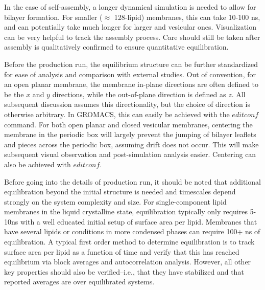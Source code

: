 \documentclass[9pt,bestpractices]{livecoms}
\begin{document}
In the case of self-assembly, a longer dynamical simulation is needed to allow for bilayer formation.
For smaller ($\approx$ 128-lipid) membranes, this can take 10-100 ns, and can potentially take much longer for larger and vesicular ones.
Visualization can be very helpful to track the assembly process.
Care should still be taken after assembly is qualitatively confirmed to ensure quantitative equilibration.

Before the production run, the equilibrium structure can be further standardized for ease of analysis and comparison with external studies.
Out of convention, for an open planar membrane, the membrane in-plane directions are often defined to be the $x$ and $y$ directions, while the out-of-plane direction is defined as $z$.
All subsequent discussion assumes this directionality, but the choice of direction is otherwise arbitrary.
In GROMACS, this can easily be achieved with the $editconf$ command.
For both open planar and closed vesicular membranes, centering the membrane in the periodic box will largely prevent the jumping of bilayer leaflets and pieces across the periodic box, assuming drift does not occur.
This will make subsequent visual observation and post-simulation analysis easier.
Centering can also be achieved with $editconf$.

Before going into the details of production run, it should be noted that additional equilibration beyond the initial structure is needed and timescales depend strongly on the system complexity and size. For single-component lipid membranes in the liquid crystalline state, equilibration typically only requires 5-10ns with a well educated initial setup of surface area per lipid. Membranes that have several lipids or conditions in more condensed phases can require 100+ ns of equilibration. A typical first order method to determine equilibration is to track surface area per lipid as a function of time and verify that this has reached equilibrium via block averages and autocorrelation analysis. However, all other key properties should also be verified--i.e., that they have stabilized and that reported averages are over equilibrated systems.
\end{document}
